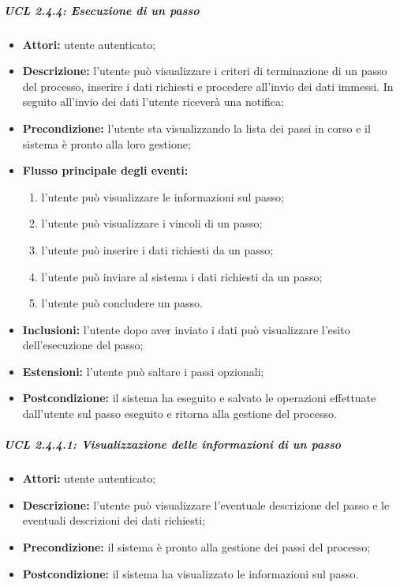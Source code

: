 \subparagraph{UCL 2.4.4: Esecuzione di un passo}
\begin{itemize}
\item \textbf{Attori:} utente autenticato;
\item \textbf{Descrizione:} l'utente può visualizzare i criteri di terminazione di un passo del processo, inserire i dati richiesti e procedere all'invio dei dati immessi. In seguito all'invio dei dati l'utente riceverà una notifica;
\item \textbf{Precondizione:} l'utente sta visualizzando la lista dei passi in corso e il sistema è pronto alla loro gestione;
\item \textbf{Flusso principale degli eventi:}
\begin{enumerate}
\item l'utente può visualizzare le informazioni sul passo;
\item l'utente può visualizzare i vincoli di un passo;
\item l'utente può inserire i dati richiesti da un passo;
\item l'utente può inviare al sistema i dati richiesti da un passo;
\item l'utente può concludere un passo.
\end{enumerate}
\item \textbf{Inclusioni:} l'utente dopo aver inviato i dati può visualizzare l'esito dell'esecuzione del passo;
\item \textbf{Estensioni:} l'utente può saltare i passi opzionali;
\item \textbf{Postcondizione:} il sistema ha eseguito e salvato le operazioni effettuate dall'utente sul passo eseguito e ritorna alla gestione del processo.
\end{itemize}

\subparagraph{UCL 2.4.4.1: Visualizzazione delle informazioni di un passo}
\begin{itemize}
\item \textbf{Attori:} utente autenticato;
\item \textbf{Descrizione:} l'utente può visualizzare l'eventuale descrizione del passo e le eventuali descrizioni dei dati richiesti;
\item \textbf{Precondizione:} il sistema è pronto alla gestione dei passi del processo;
\item \textbf{Postcondizione:} il sistema ha visualizzato le informazioni sul passo.
\end{itemize}


